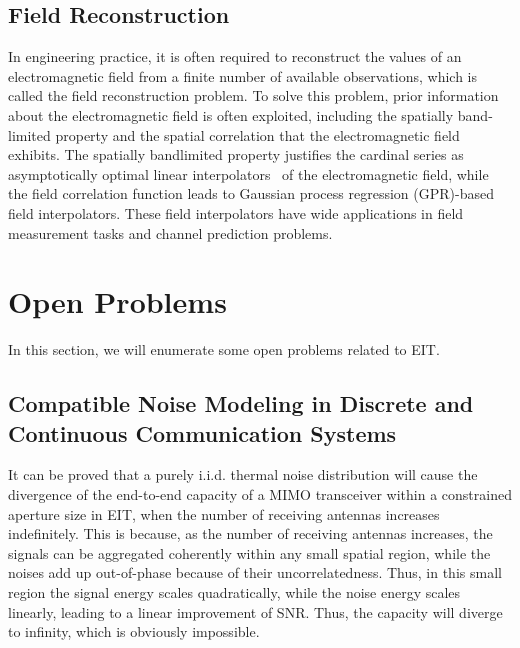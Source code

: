 \documentclass[journal,twocolumn]{IEEEtran}
\begin{document}

\subsection{Field Reconstruction}
In engineering practice, it is often required to reconstruct the values of an electromagnetic field from a finite number of available observations, which is called the field reconstruction problem. 
To solve this problem, prior information about the electromagnetic field is often exploited, including the spatially band-limited property and the spatial correlation that the electromagnetic field exhibits. 
The spatially bandlimited property justifies the cardinal series as asymptotically optimal linear interpolators~\cite{pizzo2022nyquist} of the electromagnetic field, while the field correlation function leads to Gaussian process regression (GPR)-based field interpolators. 
These field interpolators have wide applications in field measurement tasks and channel prediction problems. 

\section{Open Problems}
In this section, we will enumerate some open problems related to EIT. 

\subsection{Compatible Noise Modeling in Discrete and Continuous Communication Systems}
It can be proved that a purely i.i.d. thermal noise distribution will cause the divergence of the end-to-end capacity of a MIMO transceiver within a constrained aperture size in EIT, when the number of receiving antennas increases indefinitely. 
This is because, as the number of receiving antennas increases, the signals can be aggregated coherently within any small spatial region, while the noises add up out-of-phase because of their uncorrelatedness. 
Thus, in this small region the signal energy scales quadratically, while the noise energy scales linearly, leading to a linear improvement of SNR. Thus, the capacity will diverge to infinity, which is obviously impossible.  
\end{document}
